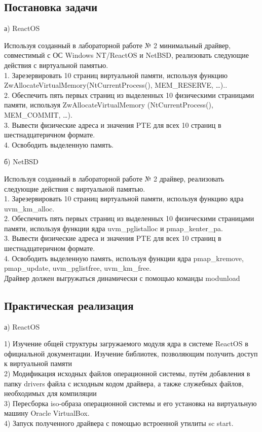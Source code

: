 \documentclass[a4paper, 14pt]{extarticle}
\begin{document}
\newpage
\begin{center}
\section{Постановка задачи}
а) ReactOS
\end{center}
Используя созданный в лабораторной работе № 2 минимальный драйвер, совместимый с ОС Windows NT/ReactOS и NetBSD, реализовать следующие действия с виртуальной памятью.\\
1. Зарезервировать  10  страниц виртуальной памяти,  используя  функцию ZwAllocateVirtualMemory(NtCurrentProcess(), MEM\_RESERVE, …)..\\
2. Обеспечить пять первых страниц из выделенных 10 физическими  страницами  памяти,  используя  ZwAllocateVirtualMemory (NtCurrentProcess(), MEM\_COMMIT, …).\\
3. Вывести физические адреса и значения PTE для всех 10 страниц в шестнадцатеричном формате.\\
4. Освободить выделенную память.

\begin{center}
б) NetBSD
\end{center}
Используя созданный в лабораторной работе № 2 драйвер, реализовать следующие действия с виртуальной памятью.\\
1. Зарезервировать 10 страниц виртуальной памяти, используя функцию ядра uvm\_km\_alloc.\\
2. Обеспечить пять первых страниц из выделенных 10 физическими страницами памяти, используя функции ядра uvm\_pglistalloc и pmap\_kenter\_pa.\\
3. Вывести физические адреса и значения PTE для всех 10 страниц в шестнадцатеричном формате.\\
4.  Освободить  выделенную  память, используя функции  ядра pmap\_kremove, pmap\_update, uvm\_pglistfree, uvm\_km\_free.\\
Драйвер должен выгружаться динамически с помощью команды modunload


\vspace{0.1em}


\newpage
\vspace{2em}
\begin{center}
\section{Практическая реализация}\label{Sect::res}
а) ReactOS
\end{center}
1) Изучение общей структуры загружаемого модуля ядра в системе
ReactOS в официальной документации. Изучение библиотек,
позволяющим получить доступ к виртуальной памяти\\
2) Модификация исходных файлов операционной системы, путём
добавления в папку drivers файла с исходным кодом драйвера, а
также служебных файлов, необходимых для компиляции\\
3) Пересборка iso-образа операционной системы и его установка на
виртуальную машину Oracle VirtualBox.\\
4) Запуск полученного драйвера с помощью встроенной утилиты sc start.\\
\end{document}
